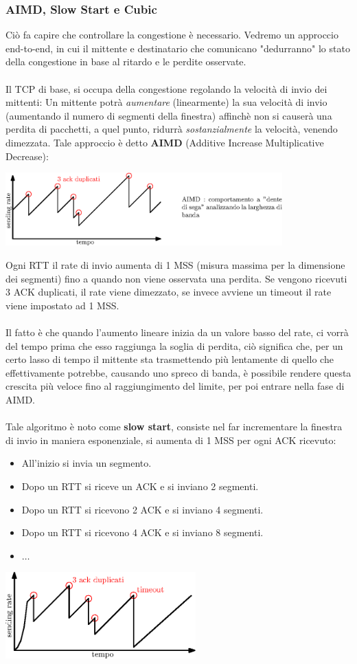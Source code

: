 \documentclass[12pt, letterpaper]{article}
\newcommand{\acc}{\\\hphantom{}\\}
\begin{document}
\subsubsection{AIMD, Slow Start e Cubic}
Ciò fa capire che controllare la congestione è necessario. Vedremo un approccio end-to-end, in cui il mittente e destinatario
che comunicano "dedurranno" lo stato della congestione in base al ritardo e le perdite osservate.\acc
Il TCP di base, si occupa della congestione regolando la velocità di invio dei mittenti: Un mittente potrà
\textit{aumentare} (linearmente) la sua velocità di invio (aumentando il numero di segmenti della finestra) affinchè non si
causerà una perdita di pacchetti, a quel punto, ridurrà \textit{sostanzialmente} la velocità, venendo
dimezzata. Tale approccio è detto \textbf{AIMD} (Additive Increase Multiplicative Decrease):\begin{center}
    \includegraphics[width=0.8\textwidth ]{images/AIMD.eps}
\end{center}
Ogni RTT il rate di invio aumenta di 1 MSS (misura massima per la dimensione dei segmenti) fino a quando non viene
osservata una perdita. Se vengono ricevuti 3 ACK duplicati, il rate viene dimezzato, se invece avviene un
timeout il rate viene impostato ad 1 MSS.\acc Il fatto è che quando l'aumento lineare inizia da un valore
basso del rate, ci vorrà del tempo prima che esso raggiunga la soglia di perdita, ciò significa che, per un certo
lasso di tempo il mittente sta trasmettendo più lentamente di quello che effettivamente potrebbe, causando uno spreco
di banda, è possibile rendere questa crescita più veloce fino al raggiungimento del limite, per poi entrare
nella fase di AIMD. \acc Tale algoritmo è noto come \textbf{slow start}, consiste nel far incrementare la finestra di
invio in maniera esponenziale, si aumenta di 1 MSS per ogni ACK ricevuto:\begin{itemize}
    \item All'inizio si invia un segmento.
    \item Dopo un RTT si riceve un ACK e si inviano 2 segmenti.
    \item Dopo un RTT si ricevono 2 ACK e si inviano 4 segmenti.
    \item Dopo un RTT si ricevono 4 ACK e si inviano 8 segmenti.
    \item $\dots$
\end{itemize}\begin{center}
    \includegraphics[width=0.55\textwidth ]{images/slowStart.eps}
\end{center}
\end{document}
